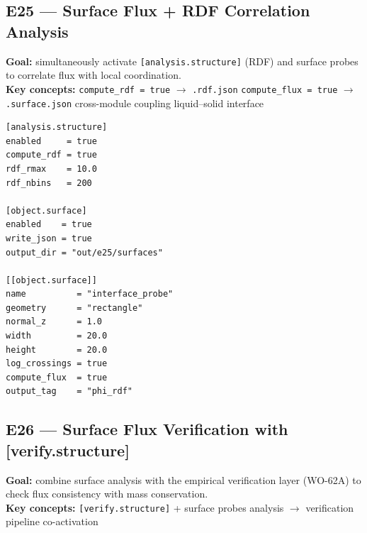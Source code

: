 \documentclass[11pt,a4paper]{article}
\begin{document}
\subsection*{E25 --- Surface Flux + RDF Correlation Analysis}

\textbf{Goal:} simultaneously activate \texttt{[analysis.structure]} (RDF)
and surface probes to correlate flux with local coordination.\\
\textbf{Key concepts:} \texttt{compute\_rdf = true} $\to$ \texttt{.rdf.json}
\textbullet{} \texttt{compute\_flux = true} $\to$ \texttt{.surface.json}
\textbullet{} cross-module coupling \textbullet{} liquid--solid interface

\begin{tcolorbox}[scriptbox, scriptheader,
  title={scripts/e25\_surface\_rdf\_correlation.vsim (excerpt)}]
\begin{lstlisting}[style=vsimlst]
[analysis.structure]
enabled     = true
compute_rdf = true
rdf_rmax    = 10.0
rdf_nbins   = 200

[object.surface]
enabled    = true
write_json = true
output_dir = "out/e25/surfaces"

[[object.surface]]
name          = "interface_probe"
geometry      = "rectangle"
normal_z      = 1.0
width         = 20.0
height        = 20.0
log_crossings = true
compute_flux  = true
output_tag    = "phi_rdf"
\end{lstlisting}
\end{tcolorbox}

\subsection*{E26 --- Surface Flux Verification with [verify.structure]}

\textbf{Goal:} combine surface analysis with the empirical verification layer
(WO-62A) to check flux consistency with mass conservation.\\
\textbf{Key concepts:} \texttt{[verify.structure]} + surface probes
\textbullet{} analysis $\to$ verification pipeline \textbullet{} co-activation
\end{document}
